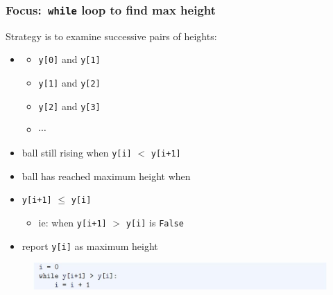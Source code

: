 \documentclass[english,14pt]{beamer}
\begin{document}
\begin{frame}[fragile]

\frametitle{Focus:~\texttt{while} loop to find max height}

Strategy is to examine successive pairs of heights:
\begin{itemize}
	\item[]
	\begin{itemize}
		\item \texttt{y[0]} and \texttt{y[1]} 
		\item \texttt{y[1]} and \texttt{y[2]} 
		\item \texttt{y[2]} and \texttt{y[3]}
		\item $\cdots$
	\end{itemize}
	
	\item ball still rising when \texttt{y[i]} $<$ \texttt{y[i+1]}
	\item ball has reached maximum height when \\
	\item[] \texttt{y[i+1]} $\leq$ \texttt{y[i]}
	\begin{itemize}
		\item[] ie: when \texttt{y[i+1]} $>$ \texttt{y[i]} is \texttt{False}
	\end{itemize}
	\item report \texttt{y[i]} as maximum height
\end{itemize}

\begin{figure}[ht]
	\centering
	\includegraphics[width=\textwidth]{figures/LLp71d}
\end{figure}

\end{frame}

\end{document}
